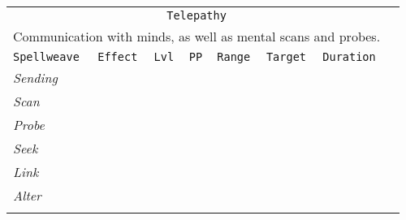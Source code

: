 \documentclass[10pt,a4paper]{article}
\begin{document}
\begin{table}[htbp!]
\begin{tabular}{llllllll}
	
 \multicolumn{7}{c}{\texttt{Telepathy}}\\
  \multicolumn{7}{c}{Communication with minds, as well as mental scans and probes.}\\
    \hline
 \texttt{Spellweave} & \texttt{Effect} & \texttt{Lvl} & \texttt{PP} & \texttt{Range} & \texttt{Target} & \texttt{Duration} \\
    \hline
    \multirow{1}{*}{\textit{Sending}}&  & &&  &  & \\
    \hline
    \multirow{1}{*}{\textit{Scan}}&  & &&  &  & \\
    \hline
    \multirow{1}{*}{\textit{Probe}}&  & &&  &  & \\
    \hline
    \multirow{1}{*}{\textit{Seek}}&  & &&  &  & \\
    \hline
    \multirow{1}{*}{\textit{Link}}&  & &&  &  & \\
    \hline
    \multirow{1}{*}{\textit{Alter}}&  & &&  &  & \\    
	&&&&&&\\		
	
\end{tabular}
\end{table} 
\end{document}
